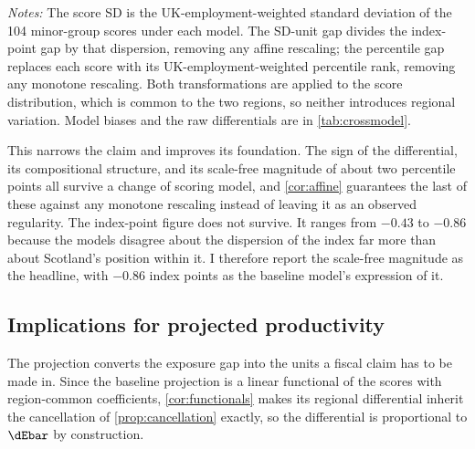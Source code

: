 \begin{table}[t]
\centering
\caption{Scale-free cross-model differentials}
\label{tab:crossmodelstd}
\small

\begin{minipage}{0.92\textwidth}
\vspace{0.4em}\footnotesize
\textit{Notes:} The score SD is the UK-employment-weighted standard deviation of the 104 minor-group scores under each model. The SD-unit gap divides the index-point gap by that dispersion, removing any affine rescaling; the percentile gap replaces each score with its UK-employment-weighted percentile rank, removing any monotone rescaling. Both transformations are applied to the score distribution, which is common to the two regions, so neither introduces regional variation. Model biases and the raw differentials are in \cref{tab:crossmodel}.
\end{minipage}
\end{table}
 
This narrows the claim and improves its foundation. The sign of the differential, its compositional structure, and its scale-free magnitude of about two percentile points all survive a change of scoring model, and \cref{cor:affine} guarantees the last of these against any monotone rescaling instead of leaving it as an observed regularity. The index-point figure does not survive. It ranges from $-0.43$ to $-0.86$ because the models disagree about the dispersion of the index far more than about Scotland's position within it. I therefore report the scale-free magnitude as the headline, with $-0.86$ index points as the baseline model's expression of it.
 
\subsection{Implications for projected productivity}\label{sec:productivity}

The projection converts the exposure gap into the units a fiscal claim has to be made in. Since the baseline projection is a linear functional of the scores with region-common coefficients, \cref{cor:functionals} makes its regional differential inherit the cancellation of \cref{prop:cancellation} exactly, so the differential is proportional to $\dEbar$ by construction. 

